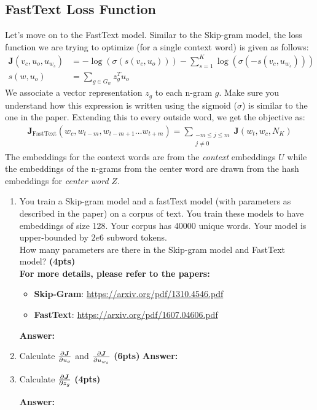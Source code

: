 \documentclass{assignment format}
\newenvironment{answer}{
    {\bf Answer:} \begingroup\color{red}
}{\endgroup}%
\begin{document}
\subsection{FastText Loss Function}
Let's move on to the FastText model.
Similar to the Skip-gram model, the loss function we are trying to optimize (for a single context word) is given as follows:
\begin{align*}
    \bm J(v_c, u_o, u_{w_s}) &= - \log(\sigma(s(v_c, u_o)))  - \sum_{s=1}^K \log(\sigma(-s(v_c, u_{w_s}))) \\
    s(w, u_o) &= \sum_{g \in G_w} z_g^T u_o
\end{align*}
We associate a vector representation $z_g$ to each n-gram $g$. 
Make sure you understand how this expression is written using the sigmoid ($\sigma$) is similar to the one in the paper. 
Extending this to every outside word, we get the objective as:
\begin{align*}
    \bm J_{\text{FastText}}(w_c, w_{t-m}, w_{t-m+1} \dots w_{t+m}) = \sum_{\substack{-m\le j \le m \\ j\ne 0}} \bm J(w_t, w_c, N_K)
\end{align*}
The embeddings for the context words are from the  \textit{context} embeddings $U$ while the embeddings of the n-grams from the center word are drawn from the hash embeddings for \textit{center word} $Z$. 

\begin{enumerate}[label=(\alph*)]
    \item You train a Skip-gram model and a fastText model (with parameters as described in the paper) on a corpus of text. You train these models to have embeddings of size 128. Your corpus has 40000 unique words. Your model is upper-bounded by $2e6$ subword tokens. \\
    How many parameters are there in the Skip-gram model and FastText model? \textbf{(4pts)}\\ 
    \textbf{For more details, please refer to the papers:}
    \begin{itemize} 
\item \textbf{Skip-Gram}: \url{https://arxiv.org/pdf/1310.4546.pdf}
\item \textbf{FastText}: \url{https://arxiv.org/pdf/1607.04606.pdf}
\end{itemize} 
\begin{answer}
\end{answer}
    \item Calculate $\pdv{\bm J}{u_o}$  and $\pdv{\bm J}{u_{w_s}}$
    \textbf{(6pts)}
    \newline
\begin{answer}
\end{answer}
    \item Calculate  $\pdv{\bm J}{z_g}$
\textbf{(4pts)}%
    
\begin{answer}
    \end{answer}
    
\end{enumerate}
\end{document}

